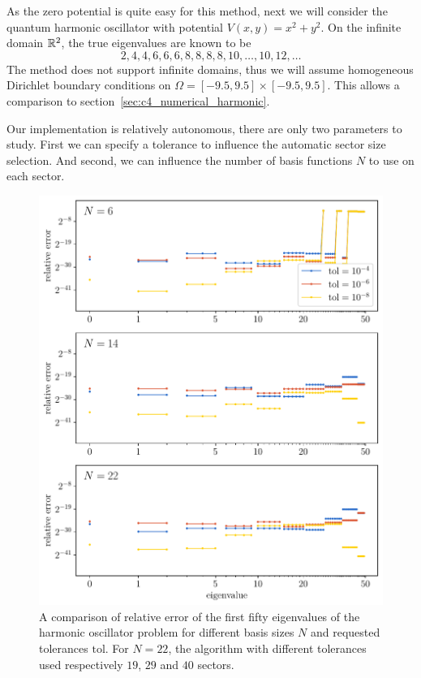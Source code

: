 As the zero potential is quite easy for this method, next we will consider the quantum harmonic oscillator with potential $V(x, y) = x^2 + y^2$. On the infinite domain $\mathbb{R}^2$, the true eigenvalues are known to be
$$
  2, 4, 4, 6, 6, 6, 8, 8, 8, 8, 10, \dots, 10, 12, \dots
$$
The method does not support infinite domains, thus we will assume homogeneous Dirichlet boundary conditions on $\Omega = [-9.5, 9.5] \times [-9.5, 9.5]$. This allows a comparison to section~\ref{sec:c4_numerical_harmonic}.

Our implementation is relatively autonomous, there are only two parameters to study. First we can specify a tolerance to influence the automatic sector size selection. And second, we can influence the number of basis functions $N$ to use on each sector.

\begin{figure}
  \begin{center}
    \includegraphics[width=\textwidth]{img/chapter3/experiments/harmonic.pdf}
  \end{center}
  \caption{A comparison of relative error of the first fifty eigenvalues of the harmonic oscillator problem for different basis sizes $N$ and requested tolerances $\text{tol}$. For $N=22$, the algorithm with different tolerances used respectively $19$, $29$ and $40$ sectors.}\label{fig:c3_experiment_harmonic}
\end{figure}

